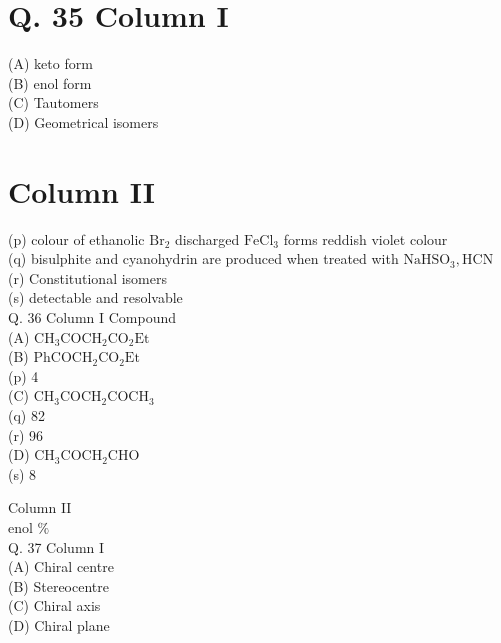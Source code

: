 \documentclass[10pt]{article}
\begin{document}
\section*{Q. 35 Column I}
(A) keto form\\
(B) enol form\\
(C) Tautomers\\
(D) Geometrical isomers

\section*{Column II}
(p) colour of ethanolic $\mathrm{Br}_{2}$ discharged $\mathrm{FeCl}_{3}$ forms reddish violet colour\\
(q) bisulphite and cyanohydrin are produced when treated with $\mathrm{NaHSO}_{3}, \mathrm{HCN}$\\
(r) Constitutional isomers\\
(s) detectable and resolvable\\
Q. 36 Column I Compound\\
(A) $\mathrm{CH}_{3} \mathrm{COCH}_{2} \mathrm{CO}_{2} \mathrm{Et}$\\
(B) $\mathrm{PhCOCH}_{2} \mathrm{CO}_{2} \mathrm{Et}$\\
(p) 4\\
(C) $\mathrm{CH}_{3} \mathrm{COCH}_{2} \mathrm{COCH}_{3}$\\
(q) 82\\
(r) 96\\
(D) $\mathrm{CH}_{3} \mathrm{COCH}_{2} \mathrm{CHO}$\\
(s) 8

Column II\\
enol $\%$\\
Q. 37 Column I\\
(A) Chiral centre\\
(B) Stereocentre\\
(C) Chiral axis\\
(D) Chiral plane
\end{document}
